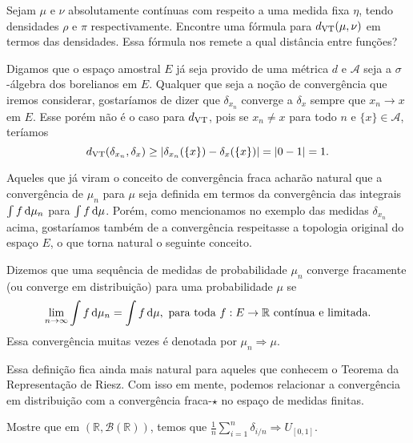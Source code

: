 \begin{exercise}
  Sejam $\mu$ e $\nu$ absolutamente contínuas com respeito a uma medida fixa $\eta$, tendo densidades $\rho$ e $\pi$ respectivamente.
  Encontre uma fórmula para $d_{\operatorname{VT}}(\mu, \nu)$ em termos das densidades.
  Essa fórmula nos remete a qual distância entre funções?
\end{exercise}

Digamos que o espaço amostral $E$ já seja provido de uma métrica $d$ e $\mathcal{A}$ seja a $\sigma$-álgebra dos borelianos em $E$.
Qualquer que seja a noção de convergência que iremos considerar, gostaríamos de dizer que $\delta_{x_n}$ converge a $\delta_x$ sempre que $x_n \to x$ em $E$.
Esse porém não é o caso para $d_{\operatorname{VT}}$, pois se $x_n \neq x$ para todo $n$ e $\{x\} \in \mathcal{A}$, teríamos
\begin{equation}
  d_{\operatorname{VT}}(\delta_{x_n}, \delta_x) \geq |\delta_{x_n}(\{x\}) - \delta_{x}(\{x\}) | = |0 - 1| = 1.
\end{equation}

Aqueles que já viram o conceito de convergência fraca acharão natural que a convergência de $\mu_n$ para $\mu$ seja definida em termos da convergência das integrais $\int f \mathop{}\!\mathrm{d} \mu_n$ para $\int f \mathop{}\!\mathrm{d} \mu$.
Porém, como mencionamos no exemplo das medidas $\delta_{x_n}$ acima, gostaríamos também de a convergência respeitasse a topologia original do espaço $E$, o que torna natural o seguinte conceito.

\begin{definition}
  Dizemos que uma sequência de medidas de probabilidade $\mu_n$ converge fracamente (ou converge em distribuição) 
  para uma probabilidade $\mu$ se 
  \begin{equation}
    \lim_{n \to \infty} \int f \mathop{}\!\mathrm{d} \mu_n = \int f \mathop{}\!\mathrm{d} \mu, \text{ para toda $f:E \to \mathbb{R}$ contínua e limitada.}
  \end{equation}
  Essa convergência muitas vezes é denotada por $\mu_n \Rightarrow \mu$.
\end{definition}

Essa definição fica ainda mais natural para aqueles que conhecem o Teorema da Representação de Riesz.
Com isso em mente, podemos relacionar a convergência em distribuição com a convergência fraca-$\star$ no espaço de medidas finitas.

\begin{exercise}
  Mostre que em $(\mathbb{R}, \mathcal{B}(\mathbb{R}))$, temos que $\tfrac{1}{n} \sum_{i=1}^n \delta_{i/n} \Rightarrow U_{[0,1]}$.
\end{exercise}

